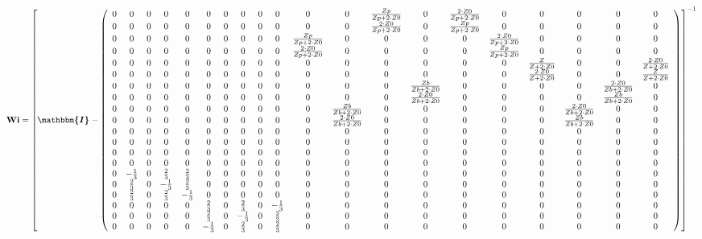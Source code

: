 \[ \mathbf{Wi} =  \left[ \boldsymbol{\mathbbm{I}}  -
\left(\begin{array}{cccccccccccccccccccc} 0 & 0 & 0 & 0 & 0 & 0 & 0 &
0 & 0 & 0 & 0 & 0 & \frac{Zp}{Zp+2\cdot Z0} & 0 & \frac{2\cdot
Z0}{Zp+2\cdot Z0} & 0 & 0 & 0 & 0 & 0 \\ 0 & 0 & 0 & 0 & 0 & 0 & 0 & 0
& 0 & 0 & 0 & 0 & \frac{2\cdot Z0}{Zp+2\cdot Z0} & 0 &
\frac{Zp}{Zp+2\cdot Z0} & 0 & 0 & 0 & 0 & 0 \\ 0 & 0 & 0 & 0 & 0 & 0 &
0 & 0 & 0 & 0 & \frac{Zp}{Zp+2\cdot Z0} & 0 & 0 & 0 & 0 & \frac{2\cdot
Z0}{Zp+2\cdot Z0} & 0 & 0 & 0 & 0 \\ 0 & 0 & 0 & 0 & 0 & 0 & 0 & 0 & 0
& 0 & \frac{2\cdot Z0}{Zp+2\cdot Z0} & 0 & 0 & 0 & 0 &
\frac{Zp}{Zp+2\cdot Z0} & 0 & 0 & 0 & 0 \\ 0 & 0 & 0 & 0 & 0 & 0 & 0 &
0 & 0 & 0 & 0 & 0 & 0 & 0 & 0 & 0 & \frac{Z}{Z+2\cdot Z0} & 0 & 0 &
\frac{2\cdot Z0}{Z+2\cdot Z0} \\ 0 & 0 & 0 & 0 & 0 & 0 & 0 & 0 & 0 & 0
& 0 & 0 & 0 & 0 & 0 & 0 & \frac{2\cdot Z0}{Z+2\cdot Z0} & 0 & 0 &
\frac{Z}{Z+2\cdot Z0} \\ 0 & 0 & 0 & 0 & 0 & 0 & 0 & 0 & 0 & 0 & 0 & 0
& 0 & \frac{Zb}{Zb+2\cdot Z0} & 0 & 0 & 0 & 0 & \frac{2\cdot
Z0}{Zb+2\cdot Z0} & 0 \\ 0 & 0 & 0 & 0 & 0 & 0 & 0 & 0 & 0 & 0 & 0 & 0
& 0 & \frac{2\cdot Z0}{Zb+2\cdot Z0} & 0 & 0 & 0 & 0 &
\frac{Zb}{Zb+2\cdot Z0} & 0 \\ 0 & 0 & 0 & 0 & 0 & 0 & 0 & 0 & 0 & 0 &
0 & \frac{Zb}{Zb+2\cdot Z0} & 0 & 0 & 0 & 0 & 0 & \frac{2\cdot
Z0}{Zb+2\cdot Z0} & 0 & 0 \\ 0 & 0 & 0 & 0 & 0 & 0 & 0 & 0 & 0 & 0 & 0
& \frac{2\cdot Z0}{Zb+2\cdot Z0} & 0 & 0 & 0 & 0 & 0 &
\frac{Zb}{Zb+2\cdot Z0} & 0 & 0 \\ 0 & 0 & 0 & 0 & 0 & 0 & 0 & 0 & 0 &
0 & 0 & 0 & 0 & 0 & 0 & 0 & 0 & 0 & 0 & 0 \\ 0 & 0 & 0 & 0 & 0 & 0 & 0
& 0 & 0 & 0 & 0 & 0 & 0 & 0 & 0 & 0 & 0 & 0 & 0 & 0 \\ 0 & 0 & 0 & 0 &
0 & 0 & 0 & 0 & 0 & 0 & 0 & 0 & 0 & 0 & 0 & 0 & 0 & 0 & 0 & 0 \\ 0 & 0
& 0 & 0 & 0 & 0 & 0 & 0 & 0 & 0 & 0 & 0 & 0 & 0 & 0 & 0 & 0 & 0 & 0 &
0 \\ 0 & -\frac{1}{3} & 0 & \frac{2}{3} & \frac{2}{3} & 0 & 0 & 0 & 0
& 0 & 0 & 0 & 0 & 0 & 0 & 0 & 0 & 0 & 0 & 0 \\ 0 & \frac{2}{3} & 0 &
-\frac{1}{3} & \frac{2}{3} & 0 & 0 & 0 & 0 & 0 & 0 & 0 & 0 & 0 & 0 & 0
& 0 & 0 & 0 & 0 \\ 0 & \frac{2}{3} & 0 & \frac{2}{3} & -\frac{1}{3} &
0 & 0 & 0 & 0 & 0 & 0 & 0 & 0 & 0 & 0 & 0 & 0 & 0 & 0 & 0 \\ 0 & 0 & 0
& 0 & 0 & \frac{2}{3} & 0 & \frac{2}{3} & 0 & -\frac{1}{3} & 0 & 0 & 0
& 0 & 0 & 0 & 0 & 0 & 0 & 0 \\ 0 & 0 & 0 & 0 & 0 & \frac{2}{3} & 0 &
-\frac{1}{3} & 0 & \frac{2}{3} & 0 & 0 & 0 & 0 & 0 & 0 & 0 & 0 & 0 & 0
\\ 0 & 0 & 0 & 0 & 0 & -\frac{1}{3} & 0 & \frac{2}{3} & 0 &
\frac{2}{3} & 0 & 0 & 0 & 0 & 0 & 0 & 0 & 0 & 0 & 0 \end{array}\right)
\right]^{-1}  \]
